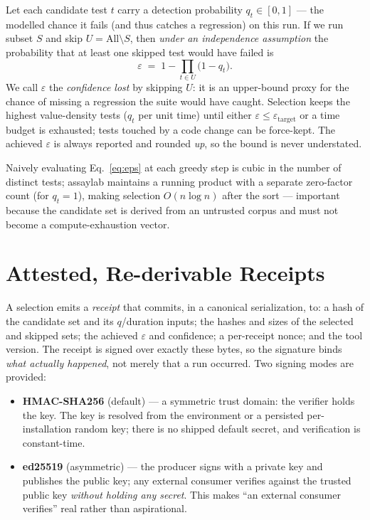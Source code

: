 \documentclass[11pt]{article}
\newcommand{\eps}{\varepsilon}
\begin{document}
Let each candidate test $t$ carry a detection probability $q_t \in [0,1]$ --- the
modelled chance it fails (and thus catches a regression) on this run. If we run
subset $S$ and skip $U = \text{All} \setminus S$, then \emph{under an
independence assumption} the probability that at least one skipped test would
have failed is
\begin{equation}
\eps \;=\; 1 - \prod_{t \in U}\bigl(1 - q_t\bigr).
\label{eq:eps}
\end{equation}
We call $\eps$ the \emph{confidence lost} by skipping $U$: it is an upper-bound
proxy for the chance of missing a regression the suite would have caught.
Selection keeps the highest value-density tests ($q_t$ per unit time) until
either $\eps \le \eps_{\text{target}}$ or a time budget is exhausted; tests
touched by a code change can be force-kept. The achieved $\eps$ is always
reported and rounded \emph{up}, so the bound is never understated.

Naively evaluating Eq.~\eqref{eq:eps} at each greedy step is cubic in the number
of distinct tests; assaylab maintains a running product with a separate
zero-factor count (for $q_t = 1$), making selection $O(n \log n)$ after the sort
--- important because the candidate set is derived from an untrusted corpus and
must not become a compute-exhaustion vector.

\section{Attested, Re-derivable Receipts}
\label{sec:attest}

A selection emits a \emph{receipt} that commits, in a canonical serialization,
to: a hash of the candidate set and its $q$/duration inputs; the hashes and
sizes of the selected and skipped sets; the achieved $\eps$ and confidence; a
per-receipt nonce; and the tool version. The receipt is signed over exactly
these bytes, so the signature binds \emph{what actually happened}, not merely
that a run occurred. Two signing modes are provided:

\begin{itemize}[leftmargin=1.4em,itemsep=2pt]
  \item \textbf{HMAC-SHA256} (default) --- a symmetric trust domain: the verifier
        holds the key. The key is resolved from the environment or a persisted
        per-installation random key; there is no shipped default secret, and
        verification is constant-time.
  \item \textbf{ed25519} (asymmetric) --- the producer signs with a private key
        and publishes the public key; any external consumer verifies against the
        trusted public key \emph{without holding any secret}. This makes ``an
        external consumer verifies'' real rather than aspirational.
\end{itemize}
\end{document}
